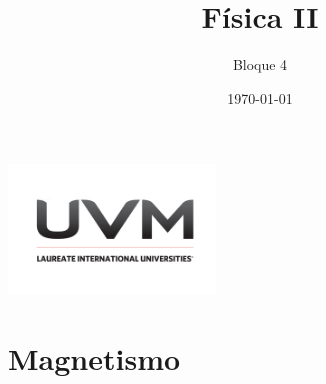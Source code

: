 \documentclass[handout]{beamer}
\title{Física II}
\author{Bloque 4}
\institute[UVM]{4\textdegree \hspace{2pt} cuatrimestre.}
\date{\today}
\begin{document}
\begin{frame}[noframenumbering]
  \titlepage
  \begin{center}
    \includegraphics[width=5.5cm]{uvm1}    
  \end{center}  
\end{frame}

\section{Magnetismo}
\end{document}

